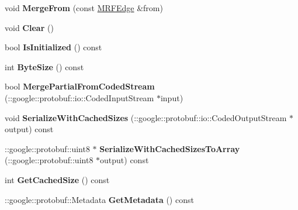 \begin{DoxyCompactItemize}
\item 
\hypertarget{classgraph_1_1MRFEdge_a861a18199b5be517a96cd5b355a3c668}{
void {\bfseries MergeFrom} (const \hyperlink{classgraph_1_1MRFEdge}{MRFEdge} \&from)}
\label{classgraph_1_1MRFEdge_a861a18199b5be517a96cd5b355a3c668}

\item 
\hypertarget{classgraph_1_1MRFEdge_ab9d3b2159e6b42fe5fe5f3c4840a151b}{
void {\bfseries Clear} ()}
\label{classgraph_1_1MRFEdge_ab9d3b2159e6b42fe5fe5f3c4840a151b}

\item 
\hypertarget{classgraph_1_1MRFEdge_a11b542bb15495a1fbee395763ee4e22d}{
bool {\bfseries IsInitialized} () const }
\label{classgraph_1_1MRFEdge_a11b542bb15495a1fbee395763ee4e22d}

\item 
\hypertarget{classgraph_1_1MRFEdge_ae857214ec9afbe8246f3027afb231770}{
int {\bfseries ByteSize} () const }
\label{classgraph_1_1MRFEdge_ae857214ec9afbe8246f3027afb231770}

\item 
\hypertarget{classgraph_1_1MRFEdge_abb481822efd72255228c00617b26a9b8}{
bool {\bfseries MergePartialFromCodedStream} (::google::protobuf::io::CodedInputStream $\ast$input)}
\label{classgraph_1_1MRFEdge_abb481822efd72255228c00617b26a9b8}

\item 
\hypertarget{classgraph_1_1MRFEdge_a8b119214980a5375a373bf7acf38f841}{
void {\bfseries SerializeWithCachedSizes} (::google::protobuf::io::CodedOutputStream $\ast$output) const }
\label{classgraph_1_1MRFEdge_a8b119214980a5375a373bf7acf38f841}

\item 
\hypertarget{classgraph_1_1MRFEdge_a5b9122af9f678bf164beab47ca09c7e5}{
::google::protobuf::uint8 $\ast$ {\bfseries SerializeWithCachedSizesToArray} (::google::protobuf::uint8 $\ast$output) const }
\label{classgraph_1_1MRFEdge_a5b9122af9f678bf164beab47ca09c7e5}

\item 
\hypertarget{classgraph_1_1MRFEdge_a2b59a32ff130f0764e937f043fd03778}{
int {\bfseries GetCachedSize} () const }
\label{classgraph_1_1MRFEdge_a2b59a32ff130f0764e937f043fd03778}

\item 
\hypertarget{classgraph_1_1MRFEdge_a3bc4a11c7f89dbff2a95e6f58b0782d9}{
::google::protobuf::Metadata {\bfseries GetMetadata} () const }
\label{classgraph_1_1MRFEdge_a3bc4a11c7f89dbff2a95e6f58b0782d9}


\end{DoxyCompactItemize}
